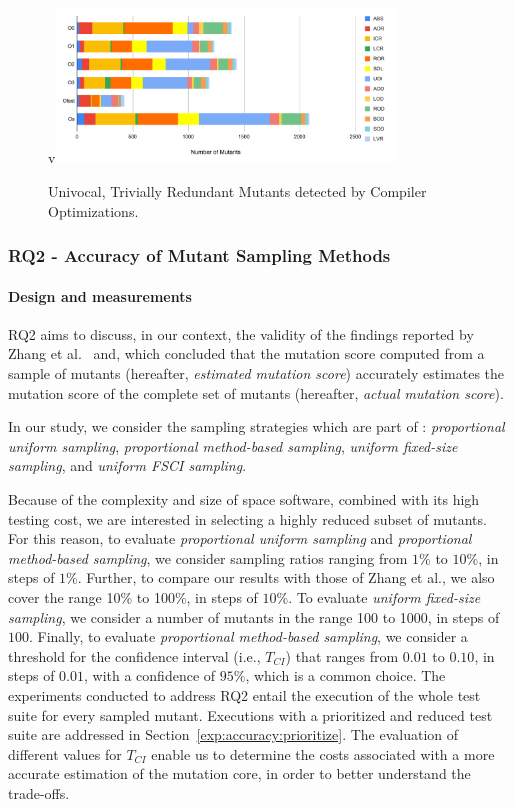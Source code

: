 \begin{figure}[tb]
\begin{center}
v\includegraphics[width=9cm]{images/univ-red}
\caption{Univocal, Trivially Redundant Mutants detected by Compiler Optimizations.}
\label{fig:results:univred}
\end{center}
\end{figure}

\subsubsection{RQ2 - Accuracy of Mutant Sampling Methods}

\paragraph{Design and measurements}


RQ2 aims to discuss, in our context, the validity of the findings reported by Zhang et al.~\cite{zhang2013operator} and, which concluded that the mutation score  computed from a sample of mutants (hereafter, \emph{estimated mutation score}) accurately estimates the mutation score of the complete set of mutants (hereafter, \emph{actual mutation score}).

In our study, we consider the sampling strategies which are part of \APPR: \emph{proportional uniform sampling}, \emph{proportional method-based sampling},  \emph{uniform fixed-size sampling}, and \emph{uniform FSCI sampling}. 


Because of the complexity and size of space software, combined with its high testing cost, we are interested in selecting a highly reduced subset of mutants. 
For this reason, 
to evaluate  \emph{proportional uniform sampling} and \emph{proportional method-based sampling},
we consider sampling ratios ranging from $1\%$ to $10\%$, in steps of $1\%$. Further, to compare our results with those of Zhang et al., we also cover the range 10\% to 100\%, in steps of $10\%$. To evaluate  \emph{uniform fixed-size sampling}, we consider a number of mutants in the range 100 to 1000, in steps of $100$.
Finally, to evaluate \emph{proportional method-based sampling}, we consider a threshold for the confidence interval (i.e., $T_{\mathit{CI}}$) that ranges from $0.01$ to $0.10$, in steps of $0.01$, with a confidence of $95\%$, which is a common choice. The experiments conducted to address RQ2 entail the execution of the whole test suite for every sampled mutant. Executions with a prioritized and reduced test suite are addressed in Section~\ref{exp:accuracy:prioritize}. The evaluation of different values for $T_{\mathit{CI}}$ enable us to determine the costs associated with a more accurate estimation of the mutation core, in order to better understand the trade-offs.


